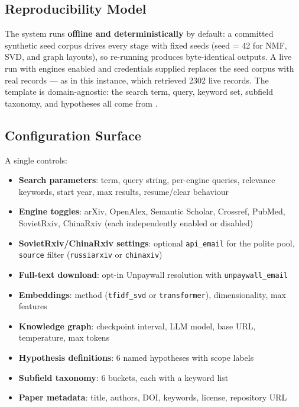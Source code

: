 \documentclass[
  english,
]{article}
\providecommand{\tightlist}{%
  \setlength{\itemsep}{0pt}\setlength{\parskip}{0pt}}
\begin{document}
\subsection{Reproducibility Model}\label{reproducibility-model}

The system runs \textbf{offline and deterministically} by default: a
committed synthetic seed corpus drives every stage with fixed seeds
(seed = 42 for NMF, SVD, and graph layouts), so re-running produces
byte-identical outputs. A live run with engines enabled and credentials
supplied replaces the seed corpus with real records --- as in this
instance, which retrieved 2302 live records. The template is
domain-agnostic: the search term, query, keyword set, subfield taxonomy,
and hypotheses all come from .

\subsection{Configuration Surface}\label{configuration-surface}

A single  controls:

\begin{itemize}
\tightlist
\item
  \textbf{Search parameters}: term, query string, per-engine queries,
  relevance keywords, start year, max results, resume/clear behaviour
\item
  \textbf{Engine toggles}: arXiv, OpenAlex, Semantic Scholar, Crossref,
  PubMed, SovietRxiv, ChinaRxiv (each independently enabled or disabled)
\item
  \textbf{SovietRxiv/ChinaRxiv settings}: optional \texttt{api\_email}
  for the polite pool, \texttt{source} filter (\texttt{russiarxiv} or
  \texttt{chinaxiv})
\item
  \textbf{Full-text download}: opt-in Unpaywall resolution with
  \texttt{unpaywall\_email}
\item
  \textbf{Embeddings}: method (\texttt{tfidf\_svd} or
  \texttt{transformer}), dimensionality, max features
\item
  \textbf{Knowledge graph}: checkpoint interval, LLM model, base URL,
  temperature, max tokens
\item
  \textbf{Hypothesis definitions}: 6 named hypotheses with scope labels
\item
  \textbf{Subfield taxonomy}: 6 buckets, each with a keyword list
\item
  \textbf{Paper metadata}: title, authors, DOI, keywords, license,
  repository URL
\end{itemize}
\end{document}
